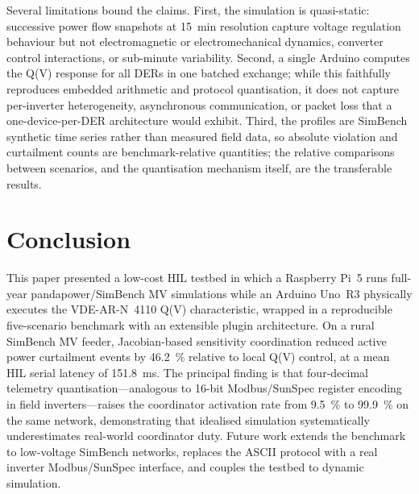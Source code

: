 \documentclass[conference]{IEEEtran}
\begin{document}
Several limitations bound the claims. First, the simulation is
quasi-static: successive power flow snapshots at \SI{15}{\minute}
resolution capture voltage regulation behaviour but not electromagnetic
or electromechanical dynamics, converter control interactions, or
sub-minute variability. Second, a single Arduino computes the Q(V)
response for all DERs in one batched exchange; while this faithfully
reproduces embedded arithmetic and protocol quantisation, it does not
capture per-inverter heterogeneity, asynchronous communication, or
packet loss that a one-device-per-DER architecture would exhibit. Third,
the profiles are SimBench synthetic time series rather than measured
field data, so absolute violation and curtailment counts are
benchmark-relative quantities; the relative comparisons between
scenarios, and the quantisation mechanism itself, are the transferable
results.

\section{Conclusion}
\label{sec:conclusion}

This paper presented a low-cost HIL testbed in which a Raspberry Pi~5
runs full-year pandapower/SimBench MV simulations while an Arduino
Uno~R3 physically executes the VDE-AR-N~4110 Q(V) characteristic, wrapped
in a reproducible five-scenario benchmark with an extensible plugin
architecture. On a rural SimBench MV feeder, Jacobian-based sensitivity
coordination reduced active power curtailment events by
\SI{46.2}{\percent} relative to local Q(V) control, at a mean HIL serial
latency of \SI{151.8}{\milli\second}. The principal finding is that
four-decimal telemetry quantisation---analogous to 16-bit Modbus/SunSpec
register encoding in field inverters---raises the coordinator activation
rate from \SI{9.5}{\percent} to \SI{99.9}{\percent} on the same network,
demonstrating that idealised simulation systematically underestimates
real-world coordinator duty. Future work extends the benchmark to
low-voltage SimBench networks, replaces the ASCII protocol with a real
inverter Modbus/SunSpec interface, and couples the testbed to dynamic
simulation.
\end{document}

